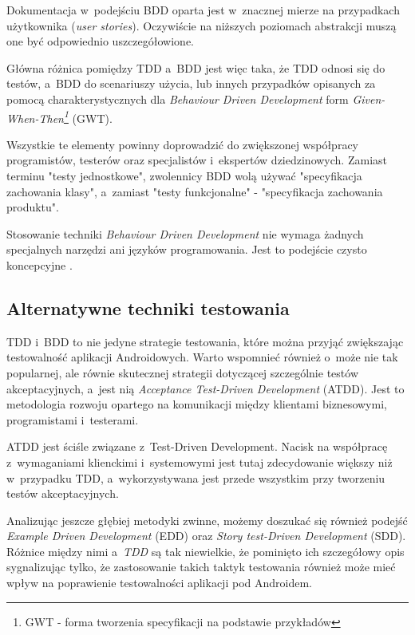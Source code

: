 Dokumentacja w~podejściu BDD oparta jest w~znacznej mierze na przypadkach użytkownika (\textit{user stories}). Oczywiście na niższych poziomach abstrakcji muszą one być odpowiednio uszczegółowione.

Główna różnica pomiędzy TDD a~BDD jest więc taka, że TDD odnosi się do testów, a~BDD do scenariuszy użycia, lub innych przypadków opisanych za pomocą charakterystycznych dla \textit{Behaviour Driven Development} form \textit{Given-When-Then\footnote{GWT - forma tworzenia specyfikacji na podstawie przykładów}} (GWT).

Wszystkie te elementy powinny doprowadzić do zwiększonej współpracy programistów, testerów oraz specjalistów i~ekspertów dziedzinowych. Zamiast terminu "testy jednostkowe", zwolennicy BDD wolą używać "specyfikacja zachowania klasy", a~zamiast "testy funkcjonalne" - "specyfikacja zachowania produktu".

Stosowanie techniki \textit{Behaviour Driven Development} nie wymaga żadnych specjalnych narzędzi ani języków programowania. Jest to podejście czysto koncepcyjne \cite{website:agile:guide}.

\subsection{Alternatywne techniki testowania}
\label{alternatywne_metody_testowania}
TDD i~BDD to nie jedyne strategie testowania, które można przyjąć zwiększając testowalność aplikacji Androidowych. Warto wspomnieć również o~może nie tak popularnej, ale równie skutecznej strategii dotyczącej szczególnie testów akceptacyjnych, a~jest nią \textit{Acceptance Test-Driven Development} (ATDD). Jest to metodologia rozwoju opartego na komunikacji między klientami biznesowymi, programistami i~testerami. 

ATDD jest ściśle związane z~Test-Driven Development. Nacisk na współpracę z~wymaganiami klienckimi i~systemowymi jest tutaj zdecydowanie większy niż w~przypadku TDD, a~wykorzystywana jest przede wszystkim przy tworzeniu testów akceptacyjnych.

Analizując jeszcze głębiej metodyki zwinne, możemy doszukać się również podejść \textit{Example Driven Development} (EDD) oraz \textit{Story test-Driven Development} (SDD). Różnice między nimi a~\textit{TDD} są tak niewielkie, że pominięto ich szczegółowy opis sygnalizując tylko, że zastosowanie takich taktyk testowania również może mieć wpływ na poprawienie testowalności aplikacji pod Androidem.  

